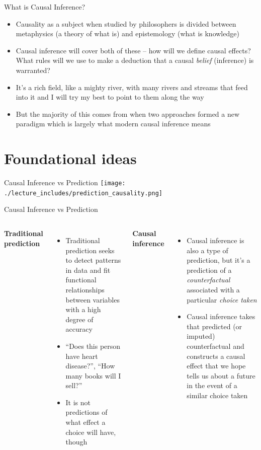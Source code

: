 \documentclass{beamer}
\begin{document}
\begin{frame}{What is Causal Inference?}

\begin{itemize}
\item Causality as a subject when studied by philosophers is divided between metaphysics (a theory of what is) and epistemology (what is knowledge)
\item Causal inference will cover both of these -- how will we define causal effects?  What rules will we use to make a deduction that a causal \emph{belief} (inference) is warranted?
\item It's a rich field, like a mighty river, with many rivers and streams that feed into it and I will try my best to point to them along the way
\item But the majority of this comes from when two approaches formed a new paradigm which is largely what modern causal inference means
\end{itemize}

\end{frame}





\section{Foundational ideas}




\begin{frame}{Causal Inference vs Prediction}
  \centering
  \texttt{[image: ./lecture\_includes/prediction\_causality.png]}
\end{frame}

\begin{frame}{Causal Inference vs Prediction}

  \begin{columns}
    \centering
    \textbf{Traditional prediction}
    \begin{itemize}
      \item Traditional prediction seeks to detect patterns in data and fit functional relationships between variables with a high degree of accuracy
      \item ``Does this person have heart disease?'', ``How many books will I sell?''
      \item It is not predictions of what effect a choice will have, though
    \end{itemize}
    \centering
    \textbf{Causal inference}
    \begin{itemize}
      \item Causal inference is also a type of prediction, but it's a prediction of a \emph{counterfactual} associated with a particular \emph{choice taken}
      \item Causal inference takes that predicted (or imputed) counterfactual and constructs a causal effect that we hope tells us about a future in the event of a similar choice taken
    \end{itemize}
  \end{columns}
\end{frame}
\end{document}
